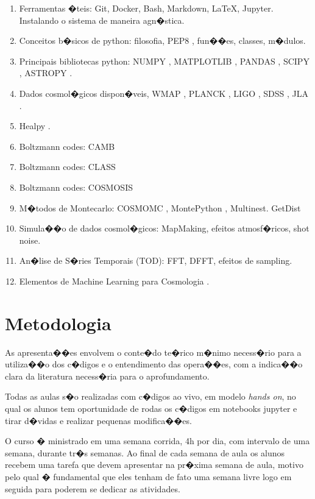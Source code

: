 \documentclass[a4paper, 11pt]{hitec}
\begin{document}
\begin{enumerate}
	\item Ferramentas �teis: Git, Docker, Bash, Markdown, \LaTeX, Jupyter. Instalando o sistema de maneira agn�stica. 
	\item Conceitos b�sicos de python: filosofia, PEP8 \cite{PEP8}, fun��es, classes, m�dulos.
	\item Principais bibliotecas python: NUMPY \cite{numpy}, MATPLOTLIB \cite{matplotlib}, PANDAS \cite{pandas}, SCIPY \cite{scipy}, ASTROPY \cite{astropy:2018}.
	\item Dados cosmol�gicos dispon�veis, WMAP \cite{wmap}, PLANCK \cite{planck}, LIGO \cite{ligo}, SDSS \cite{sdss}, JLA \cite{jla}. 
	\item Healpy \cite{healpy}.
	\item Boltzmann codes: CAMB \cite{camb}
	\item Boltzmann codes: CLASS \cite{class}
	\item Boltzmann codes: COSMOSIS \cite{cosmosis}
	\item M�todos de Montecarlo: COSMOMC \cite{cosmomc}, MontePython \cite{montepython}, Multinest. GetDist
	\item Simula��o de dados cosmol�gicos: MapMaking, efeitos atmosf�ricos, shot noise.
	\item An�lise de S�ries Temporais (TOD): FFT, DFFT, efeitos de sampling.
	\item Elementos de Machine Learning para Cosmologia \cite{astroML}.
\end{enumerate}

\section{Metodologia}

As apresenta��es envolvem o conte�do te�rico m�nimo necess�rio para a utiliza��o dos c�digos e o entendimento das opera��es, com a indica��o clara da literatura necess�ria para o aprofundamento.

Todas as aulas s�o realizadas com c�digos ao vivo, em modelo \emph{hands on}, no qual os alunos tem oportunidade de rodas os c�digos em notebooks jupyter e tirar d�vidas e realizar pequenas modifica��es.

O curso � ministrado em uma semana corrida, 4h por dia, com intervalo de uma semana, durante tr�s semanas. Ao final de cada semana de aula os alunos recebem uma tarefa que devem apresentar na pr�xima semana de aula, motivo pelo qual � fundamental que eles tenham de fato uma semana livre logo em seguida para poderem se dedicar as atividades.
\end{document}
